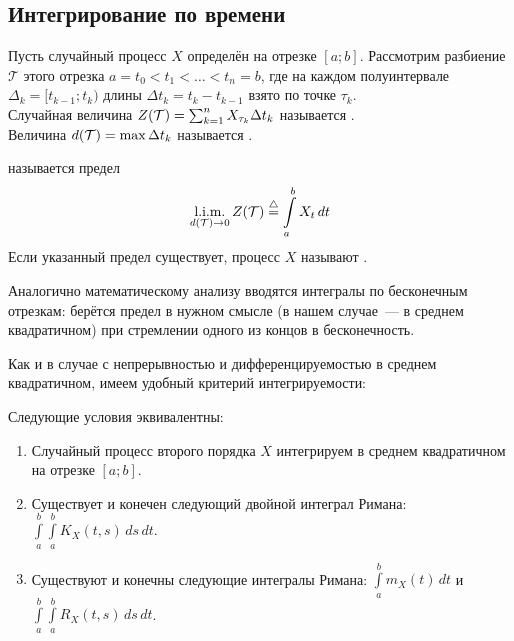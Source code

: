 \subsection{Интегрирование по времени} \label{subsection:time_integration}

\begin{definition}
    \label{definition:calculus:integral_sum}
    Пусть случайный процесс $ X $ определён на отрезке $ [a; b] $.
    Рассмотрим разбиение $ \mathcal{T} $ этого отрезка $ a = t_0 < t_1 < \ldots < t_n = b $,
    где на каждом полуинтервале $ \Delta_k = [t_{k-1}; t_k) $ длины $ \Delta t_k = t_k - t_{k-1} $ взято по точке $ \tau_k $.
    \\[0.25\baselineskip]
    Случайная величина $ Z(\mathcal{T}) = \sum_{k=1}^n X_{\tau_k} \Delta t_k $ называется
    .
    \\[0.25\baselineskip]
    Величина $ d(\mathcal{T}) = \max \Delta t_k $ называется .
\end{definition}

\begin{definition}
    \label{definition:calculus:integral}
     называется предел
    \[
        \operatorname*{\textnormal{l.i.m.}}_{d(\mathcal{T}) \to 0} Z(\mathcal{T}) \overset{\triangle}{=} \int\limits_a^b X_t \, dt
    \]
    Если указанный предел существует, процесс $ X $ называют .
\end{definition}

Аналогично математическому анализу вводятся интегралы по бесконечным отрезкам:
берётся предел в нужном смысле (в нашем случае~--- в среднем квадратичном) при стремлении одного из концов в бесконечность.

Как и в случае с непрерывностью и дифференцируемостью в среднем квадратичном,
имеем удобный критерий интегрируемости:

\begin{theorem}
    \label{theorem:calculus:mean_squares_integrability_test}
    Следующие условия эквивалентны:
    \begin{enumerate}
        \item
            Случайный процесс второго порядка $ X $ интегрируем в среднем квадратичном на отрезке $ [a; b] $.
        \item
            Существует и конечен следующий двойной интеграл Римана:
            $ \displaystyle \int\limits_a^b \int\limits_a^b K_X(t, s) \, ds \, dt $.
        \item
            Существуют и конечны следующие интегралы Римана:
            $ \displaystyle \int\limits_a^b m_X(t) \, dt $ и $ \displaystyle \int\limits_a^b \int\limits_a^b R_X(t, s) \, ds \, dt $.
    \end{enumerate}
\end{theorem}

